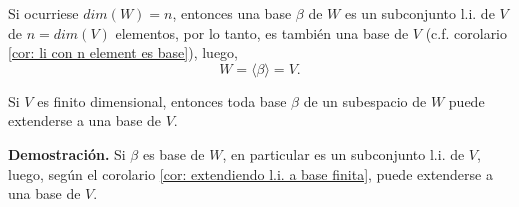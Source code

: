 Si ocurriese $dim(W) = n$, entonces una base $\beta$ de $W$
es un subconjunto l.i. de $V$ de $n = dim(V)$ elementos,
por lo tanto, es también una base de $V$
(c.f. corolario \ref{cor: li con n element es base}),
luego,
\[
W = \langle \beta \rangle = V.
\]
\QEDB
\vspace{0.2cm}

\begin{cor}
Si $V$ es finito dimensional, entonces toda base
$\beta$ de un subespacio de $W$ puede extenderse a una base de $V$.
\end{cor}
\noindent
\textbf{Demostración.}
Si $\beta$ es base de $W$, en particular es un subconjunto
l.i. de $V$, luego, según el corolario 
\ref{cor: extendiendo l.i. a base finita}, puede extenderse a una
base de $V$.
\QEDB
\vspace{0.2cm}

